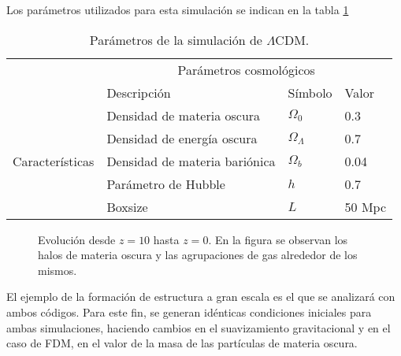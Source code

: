 \documentclass[a4paper,openright,12pt]{book}
\begin{document}

Los parámetros utilizados para esta simulación se indican en la tabla \ref{tabla 3.1}
\begin{table}[htb]
\centering
\begin{tabular}{|l|l|l|l|}
\hline
& \multicolumn{3}{c|}{Parámetros cosmológicos} \\
\cline{2-4}
& Descripción & Símbolo & Valor\\
\hline \hline
\multirow{5}{3cm}{Características} & Densidad de materia oscura & $\Omega_{0}$ & 0.3\\ \cline{2-4}
& Densidad de energía oscura & $\Omega_{\Lambda} $ & 0.7\\ \cline{2-4}
& Densidad de materia bariónica & $\Omega_{b}$ & 0.04\\ \cline{2-4}
& Parámetro de Hubble & $h$ & 0.7 \\ \cline{2-4}
& Boxsize & $L$ & 50 Mpc\\ \cline{1-4}
\end{tabular}
\caption{Parámetros de la simulación de $\Lambda$CDM.}
\label{tabla 3.1}
\end{table}


\begin{figure}[htpb]
\centering
{}
\caption{\footnotesize{Evolución desde $z=10$ hasta $z = 0$. En la figura se observan los halos de materia oscura y las agrupaciones de gas alrededor de los mismos.}} \label{fig 3.5}
\end{figure}
El ejemplo de la formación de estructura a gran escala es el que se analizará con ambos códigos. Para este fin, se generan idénticas condiciones iniciales para ambas simulaciones, haciendo cambios en el suavizamiento gravitacional y en el caso de FDM, en el valor de la masa de las partículas de materia oscura.  
\end{document}
